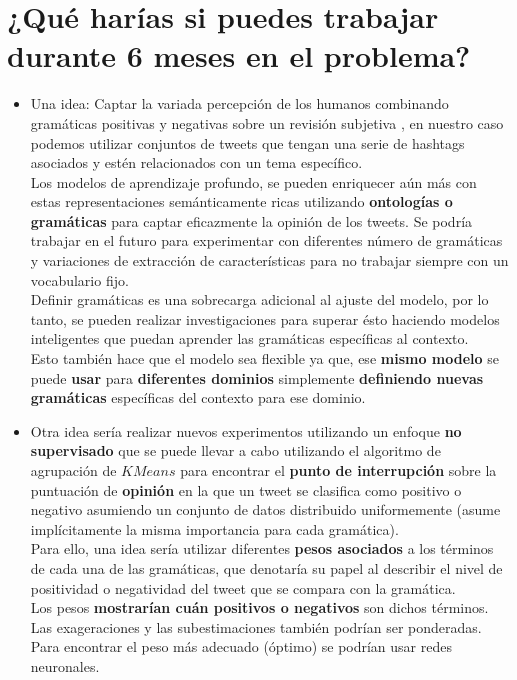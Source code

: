 \documentclass[a4paper,12pt]{report}
\begin{document}
\section{¿Qué harías si puedes trabajar durante 6 meses en el problema?}

\begin{itemize}


\item Una idea: Captar la variada percepción de los humanos combinando gramáticas positivas y negativas sobre un
revisión subjetiva \cite{Bhuvan}, en nuestro caso podemos utilizar conjuntos de tweets que tengan una serie de hashtags asociados y estén relacionados con un tema específico. 
\vspace{2mm}\\
Los modelos de aprendizaje profundo, se pueden enriquecer aún más con estas representaciones semánticamente ricas utilizando \textbf{ontologías o gramáticas} para captar eficazmente la opinión de los tweets. Se podría trabajar en el futuro para experimentar con diferentes número de gramáticas y variaciones de extracción de características para no trabajar siempre con un vocabulario fijo.
\vspace{2mm}\\
Definir gramáticas es una sobrecarga adicional al ajuste del modelo, por lo tanto, se pueden realizar investigaciones para superar ésto haciendo modelos inteligentes que puedan aprender las gramáticas específicas al contexto.
\vspace{2mm}\\
Esto también hace que el modelo sea flexible ya que, ese \textbf{mismo modelo} se puede \textbf{usar} para \textbf{diferentes dominios} simplemente \textbf{definiendo nuevas gramáticas} específicas del contexto para ese dominio.

\item Otra idea sería realizar nuevos experimentos utilizando un enfoque \textbf{no supervisado} que se puede llevar a cabo utilizando el algoritmo de agrupación de $KMeans$ para encontrar el \textbf{punto de interrupción} sobre la puntuación de \textbf{opinión} en la que un tweet se clasifica como positivo o
negativo asumiendo un conjunto de datos distribuido uniformemente (asume implícitamente la misma importancia para cada gramática).
\vspace{2mm}\\
Para ello, una idea sería utilizar diferentes \textbf{pesos asociados} a los términos de cada una de las gramáticas, que denotaría su papel al describir el nivel de positividad o negatividad del tweet que se compara con la gramática. 
\vspace{2mm}\\
Los pesos \textbf{mostrarían cuán positivos o negativos} son dichos términos. Las exageraciones y las subestimaciones también podrían ser ponderadas. Para encontrar el peso más adecuado (óptimo) se podrían usar redes neuronales.

\end{itemize}
\end{document}

